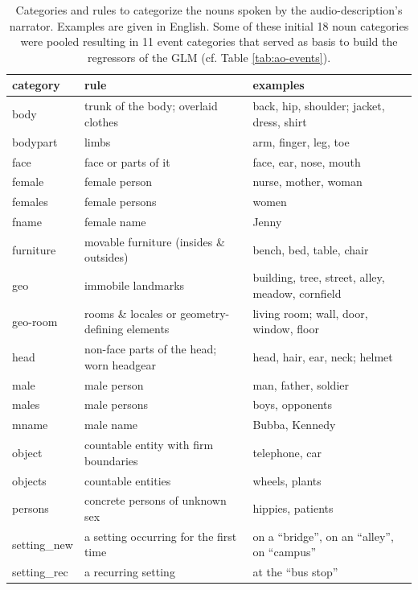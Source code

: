 \documentclass[english]{article}
\begin{document}
\begin{table}[h!]
    \caption{Categories and rules to categorize the nouns spoken by
        the audio-description's narrator.
        Examples are given in English.
        Some of these initial 18 noun categories were pooled resulting in 11
        event categories that served as basis to build the regressors of the
        GLM
        (cf. Table \ref{tab:ao-events}).
}
\label{tab:descr-nouns-rules}
\begin{tabular}{lll}
\toprule
\textbf{category} & \textbf{rule} & \textbf{examples} \\
\midrule
body & trunk of the body; overlaid clothes & back, hip, shoulder; jacket, dress, shirt
\tabularnewline
bodypart & limbs & arm, finger, leg, toe
\tabularnewline
face & face or parts of it & face, ear, nose, mouth
\tabularnewline
female & female person & nurse, mother, woman
\tabularnewline
females & female persons & women
\tabularnewline
fname & female name & Jenny
\tabularnewline
furniture & movable furniture (insides \& outsides) & bench, bed, table, chair
\tabularnewline
geo & immobile landmarks & building, tree, street, alley, meadow, cornfield \tabularnewline
geo-room & rooms \& locales or geometry-defining elements & living room; wall, door, window, floor
\tabularnewline
head & non-face parts of the head; worn headgear & head, hair, ear, neck;
helmet
\tabularnewline
male & male person & man, father, soldier
\tabularnewline
males & male persons & boys, opponents
\tabularnewline
mname & male name & Bubba, Kennedy
\tabularnewline
object & countable entity with firm boundaries & telephone, car
\tabularnewline
objects & countable entities & wheels, plants
\tabularnewline
persons & concrete persons of unknown sex & hippies, patients
\tabularnewline
setting\_new & a setting occurring for the first time & on a ``bridge'', on an ``alley'', on ``campus''
\tabularnewline
setting\_rec & a recurring setting & at the ``bus stop'' \tabularnewline
\bottomrule
\end{tabular}
\end{table}
\end{document}
